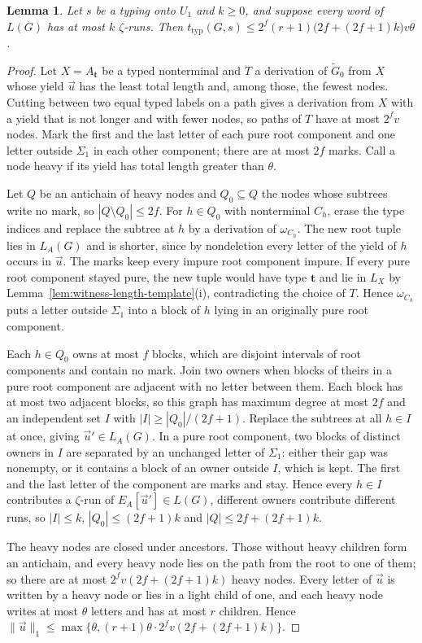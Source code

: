 \documentclass[11pt]{article}
\numberwithin{equation}{section}
\theoremstyle{plain}
\newtheorem{lemma}[theorem]{Lemma}
\theoremstyle{definition}
\theoremstyle{remark}
\newcommand{\tuple}[1]{\vec{#1}}
\begin{document}
\begin{lemma}\label{lem:app-u1-runs}
Let $s$ be a typing onto $U_1$ and $k\ge0$, and suppose every word of $L(G)$ has
at most $k$ $\zeta$-runs.  Then
$t_{\mathrm{typ}}(G,s)\le2^f(r+1)\bigl(2f+(2f+1)k\bigr)v\theta$.
\end{lemma}

\begin{proof}
Let $X=A_{\mathbf t}$ be a typed nonterminal and $T$ a derivation of
$\widetilde G_0$ from $X$ whose yield $\tuple u$ has the least total length and,
among those, the fewest nodes.  Cutting between two equal typed labels on a path
gives a derivation from $X$ with a yield that is not longer and with fewer
nodes, so paths of $T$ have at most $2^fv$ nodes.  Mark the first and the last
letter of each pure root component and one letter outside $\Sigma_1$ in each
other component; there are at most $2f$ marks.  Call a node heavy if its yield
has total length greater than $\theta$.

Let $Q$ be an antichain of heavy nodes and $Q_0\subseteq Q$ the nodes whose
subtrees write no mark, so $|Q\setminus Q_0|\le2f$.  For $h\in Q_0$ with
nonterminal $C_h$, erase the type indices and replace the subtree at $h$ by a
derivation of $\omega_{C_h}$.  The new root tuple lies in $L_A(G)$ and is shorter,
since by nondeletion every letter of the yield of $h$ occurs in $\tuple u$.  The
marks keep every impure root component impure.  If every pure root component
stayed pure, the new tuple would have type $\mathbf t$ and lie in $L_X$ by
Lemma~\ref{lem:witness-length-template}(i), contradicting the choice of $T$.
Hence $\omega_{C_h}$ puts a letter outside $\Sigma_1$ into a block of $h$ lying in
an originally pure root component.

Each $h\in Q_0$ owns at most $f$ blocks, which are disjoint intervals of root
components and contain no mark.  Join two owners when blocks of theirs in a pure
root component are adjacent with no letter between them.  Each block has at most
two adjacent blocks, so this graph has maximum degree at most $2f$ and an
independent set $I$ with $|I|\ge|Q_0|/(2f+1)$.  Replace the subtrees at all
$h\in I$ at once, giving $\tuple u'\in L_A(G)$.  In a pure root component, two
blocks of distinct owners in $I$ are separated by an unchanged letter of
$\Sigma_1$: either their gap was nonempty, or it contains a block of an owner
outside $I$, which is kept.  The first and the last letter of the component are
marks and stay.  Hence every $h\in I$ contributes a $\zeta$-run of
$E_A[\tuple u']\in L(G)$, different owners contribute different runs, so
$|I|\le k$, $|Q_0|\le(2f+1)k$ and $|Q|\le2f+(2f+1)k$.

The heavy nodes are closed under ancestors.  Those without heavy children form
an antichain, and every heavy node lies on the path from the root to one of
them; so there are at most $2^fv(2f+(2f+1)k)$ heavy nodes.  Every letter of
$\tuple u$ is written by a heavy node or lies in a light child of one, and each
heavy node writes at most $\theta$ letters and has at most $r$ children.  Hence
$\|\tuple u\|_1\le\max\{\theta,(r+1)\theta\cdot2^fv(2f+(2f+1)k)\}$.
\end{proof}
\end{document}
